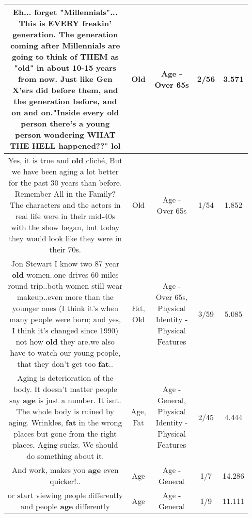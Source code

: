 \documentclass[11pt]{article}
\newlength\mylength
\begin{document}
\begin{center}
\begin{longtable}{|C{.65\mylength}|C{.30\mylength}|C{.12\mylength}|C{.12\mylength}|C{.12\mylength}|}
  \small Eh... forget "Millennials"...  This is EVERY freakin' generation. The generation coming after Millennials are going to think of THEM as "\textbf{old}" in about 10-15 years from now. Just like Gen X'ers did before them, and the generation before, and on and on."Inside every \textbf{old} person there's a young person wondering WHAT THE HELL happened??"  lol\normalsize   & Old & Age - Over 65s & 2/56 & 3.571 \\  \hline
  \small Yes, it is true and \textbf{old} cliché, But we have been aging a lot better for the past 30 years than before. Remember All in the Family? The characters and the actors in real life were in their mid-40s with the show began, but today they would look like they were in their 70s.\normalsize   & Old & Age - Over 65s & 1/54 & 1.852 \\  \hline
  \small Jon Stewart I know two 87 year \textbf{old} women..one drives 60 miles round trip..both women still wear makeup..even more than the younger ones (I think it's when many people were born; and yes, I think it's changed since 1990) not how \textbf{old} they are.we also have to watch our young people, that they don't get too \textbf{fat}..\normalsize   & Fat, Old & Age - Over 65s, Physical Identity - Physical Features & 3/59 & 5.085 \\  \hline
  \small Aging is deterioration of the body. It doesn't matter people say \textbf{age} is just a number. It isnt. The whole body is ruined by aging. Wrinkles, \textbf{fat} in the wrong places but gone from the right places. Aging sucks. We should do something about it.\normalsize   & Age, Fat & Age - General, Physical Identity - Physical Features & 2/45 & 4.444 \\  \hline
  \small And work, makes you \textbf{age} even quicker!..\normalsize   & Age & Age - General & 1/7 & 14.286 \\  \hline
  \small or start viewing people differently  and people \textbf{age} differently\normalsize   & Age & Age - General & 1/9 & 11.111 \\  \hline

\end{longtable}
\end{center}
\end{document}
